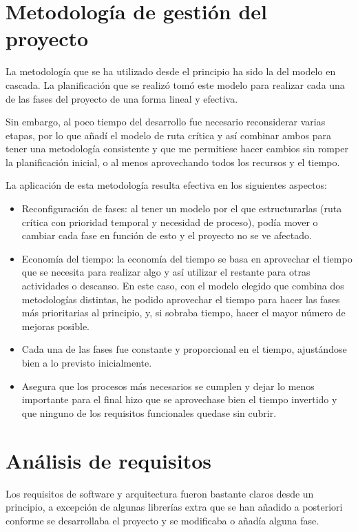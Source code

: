 

\section{Metodología de gestión del proyecto}
La metodología que se ha utilizado desde el principio ha sido la del modelo en cascada. La planificación que se realizó tomó este modelo para realizar cada una de las fases del proyecto de una forma lineal y efectiva.

Sin embargo, al poco tiempo del desarrollo fue necesario reconsiderar varias etapas, por lo que añadí el modelo de ruta crítica y así combinar ambos para tener una metodología consistente y que me permitiese hacer cambios sin romper la planificación inicial, o al menos aprovechando todos los recursos y el tiempo.

La aplicación de esta metodología resulta efectiva en los siguientes aspectos:
\begin{itemize}
 \item Reconfiguración de fases: al tener un modelo por el que estructurarlas (ruta crítica con prioridad temporal y necesidad de proceso), podía mover o cambiar cada fase en función de esto y el proyecto no se ve afectado.
 \item Economía del tiempo: la economía del tiempo se basa en aprovechar el tiempo que se necesita para realizar algo y así utilizar el restante para otras actividades o descanso. En este caso, con el modelo elegido que combina dos metodologías distintas, he podido aprovechar el tiempo para hacer las fases más prioritarias al principio, y, si sobraba tiempo, hacer el mayor número de mejoras posible.
 \item Cada una de las fases fue constante y proporcional en el tiempo, ajustándose bien a lo previsto inicialmente.
 \item Asegura que los procesos más necesarios se cumplen y dejar lo menos importante para el final hizo que se aprovechase bien el tiempo invertido y que ninguno de los requisitos funcionales quedase sin cubrir.
\end{itemize}

\section{Análisis de requisitos}
Los requisitos de software y arquitectura fueron bastante claros desde un principio, a excepción de algunas librerías extra que se han añadido a posteriori conforme se desarrollaba el proyecto y se modificaba o añadía alguna fase.

